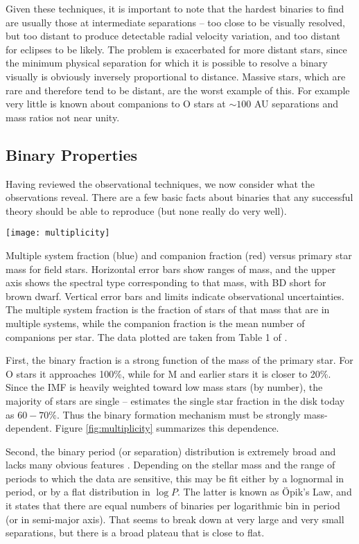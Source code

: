 Given these techniques, it is important to note that the hardest binaries to find are usually those at intermediate separations -- too close to be visually resolved, but too distant to produce detectable radial velocity variation, and too distant for eclipses to be likely. The problem is exacerbated for more distant stars, since the minimum physical separation for which it is possible to resolve a binary visually is obviously inversely proportional to distance. Massive stars, which are rare and therefore tend to be distant, are the worst example of this. For example very little is known about companions to O stars at $\sim 100$ AU separations and mass ratios not near unity.

\subsection{Binary Properties}

Having reviewed the observational techniques, we now consider what the observations reveal. There are a few basic facts about binaries that any successful theory should be able to reproduce (but none really do very well).

\begin{marginfigure}
\texttt{[image: multiplicity]}
\caption[Multiple system fraction versus stellar mass]{
\label{fig:multiplicity}
Multiple system fraction (blue) and companion fraction (red) versus primary star mass for field stars. Horizontal error bars show ranges of mass, and the upper axis shows the spectral type corresponding to that mass, with BD short for brown dwarf. Vertical error bars and limits indicate observational uncertainties. The multiple system fraction is the fraction of stars of that mass that are in multiple systems, while the companion fraction is the mean number of companions per star. The data plotted are taken from Table 1 of \citep{duchene13a}.
}
\end{marginfigure}

First, the binary fraction is a strong function of the mass of the primary star. For O stars it approaches 100\%, while for M and earlier stars it is closer to 20\%. Since the IMF is heavily weighted toward low mass stars (by number), the majority of stars are single -- \citet{lada06a} estimates the single star fraction in the disk today as $60-70\%$. Thus the binary formation mechanism must be strongly mass-dependent. Figure \ref{fig:multiplicity} summarizes this dependence.

Second, the binary period (or separation) distribution is extremely broad and lacks many obvious features \citep{duquennoy91a}. Depending on the stellar mass and the range of periods to which the data are sensitive, this may be fit either by a lognormal in period, or by a flat distribution in $\log P$. The latter is known as \"{O}pik's Law, and it states that there are equal numbers of binaries per logarithmic bin in period (or in semi-major axis). That seems to break down at very large and very small separations, but there is a broad plateau that is close to flat.

